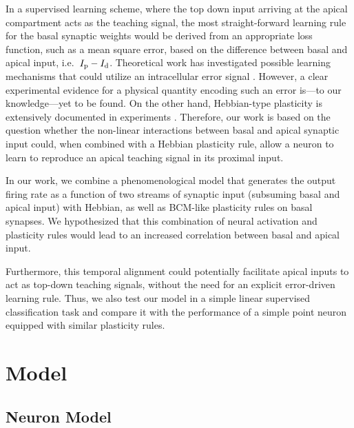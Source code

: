 \documentclass[10pt,a4paper,twocolumn]{article}
\begin{document}
		In a supervised learning scheme, where the top down input
		arriving at the apical compartment acts as the teaching signal,
		the most straight-forward learning rule for the basal synaptic
		weights would be derived from an appropriate loss function,
		such as a mean square error, based on the difference between 
		basal and apical input, i.e.\ $I_{\rm p} - I_{\rm d}$. Theoretical work has 
		investigated possible learning mechanisms
		that could utilize an intracellular error signal
		\citep{Urbanczik2014,Schiess2016,Guerguiev2017}.
		However, a clear experimental
		evidence for a physical quantity encoding such an error 
		is---to our knowledge---yet to be found. 
		On the other hand, Hebbian-type plasticity is extensively
		documented in experiments \cite{Gustafsson1987,Debanne1994,Markram1997,Bi1998}. 
		Therefore, our work is
		based on the question whether the non-linear interactions
		between basal and apical synaptic input could, when
		combined with a Hebbian plasticity rule, allow a neuron
		to learn to reproduce an apical teaching signal in its
		proximal input.
		
		In our work, we combine a phenomenological model that generates the output
		firing rate as a function of two streams of synaptic input (subsuming basal and apical input)
		with Hebbian, as well as BCM-like plasticity rules on basal synapses. We hypothesized that 
		this combination of neural activation and plasticity rules would lead to an
		increased correlation between basal and apical input.
		
		Furthermore, this temporal alignment could potentially facilitate apical inputs to act
		as top-down teaching signals, without the need for an explicit error-driven
		learning rule. Thus, we also test our model in a simple linear 
		supervised classification task and compare it with the performance of a simple
		point neuron equipped with similar plasticity rules.
		
		\section{Model}
		
		\subsection{Neuron Model}
		
\end{document}
